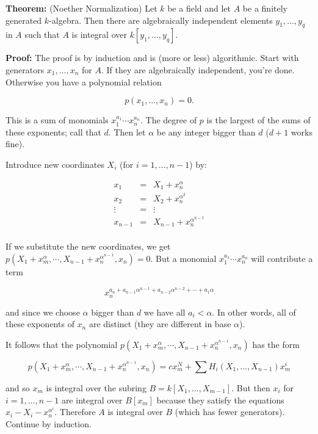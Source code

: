 \documentclass[]{article}
\begin{document}
\textbf{Theorem:} (Noether Normalization) Let \(k\) be a field and let
\(A\) be a finitely generated \(k\)-algebra. Then there are
algebraically independent elements \(y_1,\ldots, y_q\) in \(A\) such
that \(A\) is integral over \(k[y_1,\ldots, y_q]\).

\textbf{Proof:} The proof is by induction and is (more or less)
algorithmic. Start with generators \(x_1,\ldots, x_n\) for \(A\). If
they are algebraically independent, you're done. Otherwise you have a
polynomial relation

\[
p(x_1,\ldots, x_n)=0.
\]

This is a sum of monomials \(x_1^{a_1}\cdots x_n^{a_n}\). The degree of
\(p\) is the largest of the sums of these exponents; call that \(d\).
Then let \(\alpha\) be any integer bigger than \(d\) (\(d+1\) works
fine).

Introduce new coordinates \(X_i\) (for \(i=1,\ldots, n-1\)) by:

\[
\begin{array}{rcl}
x_1 &=& X_1 + x_n^{\alpha}\\
x_2 &=& X_2 + x_n^{\alpha^2}\\
\vdots &=& \vdots\\
x_{n-1} &=& X_{n-1} + x_n^{\alpha^{n-1}}\\
\end{array}
\]

If we substitute the new coordinates, we get
\(p(X_1+x_m^{\alpha},\cdots, X_{n-1}+x_n^{\alpha^{n-1}},x_n)=0\). But a
monomial \(x_1^{a_1}\cdots x_n^{a_n}\) will contribute a term

\[
x_n^{a_n+a_{n-1}\alpha^{n-1}+a_{n-2}\alpha^{n-2}+\cdots+a_1\alpha}
\]

and since we choose \(\alpha\) bigger than \(d\) we have all
\(a_i<\alpha\). In other words, all of these exponents of \(x_n\) are
distinct (they are different in base \(\alpha\)).

It follows that the polynomial
\(p(X_1+x_m^{\alpha},\cdots, X_{n-1}+x_n^{\alpha^{n-1}},x_n)\) has the
form

\[
p(X_1+x_m^{\alpha},\cdots, X_{n-1}+x_n^{\alpha^{n-1}},x_n)=cx_m^{N}+\sum H_{i}(X_1,\ldots, X_{n-1})x_m^{i}
\]

and so \(x_m\) is integral over the subring
\(B=k[X_1,\ldots, X_{m-1}]\). But then \(x_i\) for \(i=1,\ldots,n-1\)
are integral over \(B[x_{m}]\) because they satisfy the equations
\(x_i-X_{i}-x_{n}^{\alpha^{i}}\). Therefore \(A\) is integral over \(B\)
(which has fewer generators). Continue by induction.
\end{document}
